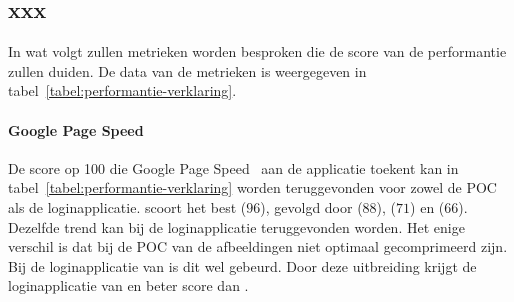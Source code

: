 
\subsection{xxx}
\label{sec:evaluatie-performantie-xxx}

In wat volgt zullen metrieken worden besproken die de score van de performantie zullen duiden.
De data van de metrieken is weergegeven in tabel~\ref{tabel:performantie-verklaring}.

\begin{table}[H]
\centering
{}
\caption{Metrieken gebruikt bij de verklaring van performantiecriterium voor \st{}~(\sta), \kendo{}~(\kendoa), \jqm{}~(\jqma) en \lungo{}~(\lungoa).}
\label{tabel:performantie-verklaring}
\end{table}

\paragraph{Google Page Speed}
De score op 100 die Google Page Speed~\cite{Morgan2011} aan de applicatie toekent kan in tabel~\ref{tabel:performantie-verklaring} worden teruggevonden voor zowel de POC als de loginapplicatie.
\st{} scoort het best ($96$),  gevolgd door \lungo{} ($88$),  \jqm{}($71$) en \kendo{}($66$).
Dezelfde trend kan bij de loginapplicatie teruggevonden worden.
Het enige verschil is dat bij de POC van \kendo{} de afbeeldingen niet optimaal gecomprimeerd zijn.
Bij de loginapplicatie van \kendo{} is dit wel gebeurd.
Door deze uitbreiding krijgt de loginapplicatie van \kendo{} en beter score dan \jqm{}.

